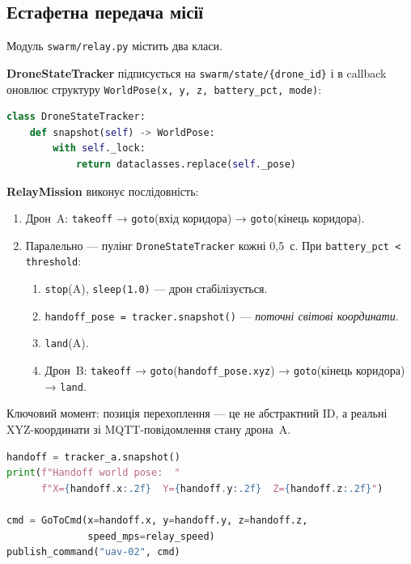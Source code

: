 \subsection{Естафетна передача місії}

Модуль \texttt{swarm/relay.py} містить два класи.

\textbf{DroneStateTracker} підписується на \texttt{swarm/state/\{drone\_id\}} і в callback оновлює структуру \texttt{WorldPose(x, y, z, battery\_pct, mode)}:

\begin{lstlisting}[language=Python, caption={Thread-safe читання позиції}]
class DroneStateTracker:
    def snapshot(self) -> WorldPose:
        with self._lock:
            return dataclasses.replace(self._pose)
\end{lstlisting}

\textbf{RelayMission} виконує послідовність:

\begin{enumerate}[itemsep=2pt]
  \item Дрон~A: \texttt{takeoff} → \texttt{goto}(вхід коридора) → \texttt{goto}(кінець коридора).
  \item Паралельно — пулінг \texttt{DroneStateTracker} кожні 0,5~с. При \texttt{battery\_pct < threshold}:
  \begin{enumerate}
    \item \texttt{stop}(A), \texttt{sleep(1.0)} — дрон стабілізується.
    \item \texttt{handoff\_pose = tracker.snapshot()} — \emph{поточні світові координати}.
    \item \texttt{land}(A).
    \item Дрон~B: \texttt{takeoff} → \texttt{goto}(\texttt{handoff\_pose.xyz}) → \texttt{goto}(кінець коридора) → \texttt{land}.
  \end{enumerate}
\end{enumerate}

Ключовий момент: позиція перехоплення — це не абстрактний ID, а реальні XYZ-координати зі MQTT-повідомлення стану дрона~A.

\begin{lstlisting}[language=Python, caption={Перехоплення поточних координат}]
handoff = tracker_a.snapshot()
print(f"Handoff world pose:  "
      f"X={handoff.x:.2f}  Y={handoff.y:.2f}  Z={handoff.z:.2f}")

cmd = GoToCmd(x=handoff.x, y=handoff.y, z=handoff.z,
              speed_mps=relay_speed)
publish_command("uav-02", cmd)
\end{lstlisting}

